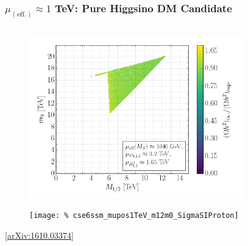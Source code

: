 \documentclass[10pt,aspectratio=169]{beamer}
\begin{document}
\begin{frame}
  \frametitle{$\mu_{(\text{eff.})} \approx 1$ TeV: Pure Higgsino DM
    Candidate}
    \begin{columns}[t]
    \begin{column}{0.3\textwidth}
      \vspace{-20pt}
      \begin{figure}
        \includegraphics[width=1.1\textwidth]{cse6ssm_mupos1TeV_m12m0_Omega}
      \end{figure}
      \vspace{-30pt}
      \begin{figure}
        \texttt{[image: \%
          cse6ssm\_mupos1TeV\_m12m0\_SigmaSIProton]}
      \end{figure}
      \vspace{-20pt}
      \begin{center}
        \tiny [\href{https://arxiv.org/abs/1610.03374}{arXiv:1610.03374}]
      \end{center}
    \end{column}
    \begin{column}{0.7\textwidth}
      \begin{columns}[t]
        \begin{column}{0.5\textwidth}
          \vspace{-32pt}
          \begin{figure}
            \hspace*{20pt}

\end{figure}
\end{column}
\end{columns}
\end{column}
\end{columns}
\end{frame}
\end{document}
